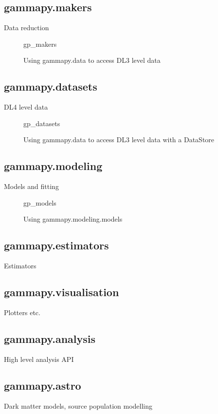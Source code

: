 \subsection{gammapy.makers}
Data reduction

\begin{figure}
{gp_makers}

\caption{Using gammapy.data to access DL3 level data}
\label{ig*:minted:gp_makers}
\end{figure}


\subsection{gammapy.datasets}
DL4 level data


\begin{figure}

{gp_datasets}
\caption{Using gammapy.data to access DL3 level data with a DataStore}
\label{fig*:minted:gp_datasets}
\end{figure}



\subsection{gammapy.modeling}
Models and fitting

\begin{figure}
{gp_models}
\caption{Using gammapy.modeling.models}
\label{fig*:minted:gp_models}
\end{figure}


\subsection{gammapy.estimators}
Estimators

\subsection{gammapy.visualisation}
Plotters etc.

\subsection{gammapy.analysis}
High level analysis API

\subsection{gammapy.astro}
Dark matter models, source population modelling

